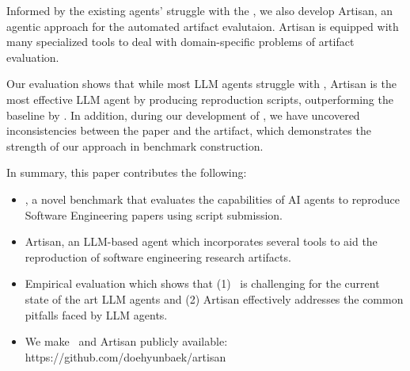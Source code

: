 Informed by the existing agents' struggle with the \benchmark, we also develop Artisan, an agentic approach for the automated artifact evalutaion.
Artisan is equipped with many specialized tools to deal with domain-specific problems of artifact evaluation.

Our evaluation shows that while most LLM agents struggle with \benchmark, Artisan is the most effective LLM agent by producing \artisanpartial{} reproduction scripts, outperforming the baseline by \artisanpartialoutperform{}.
In addition, during our development of \benchmark, we have uncovered \inconsistencies{} inconsistencies between the paper and the artifact, which demonstrates the strength of our approach in benchmark construction.

In summary, this paper contributes the following:
\begin{itemize}
    \item \benchmark, a novel benchmark that evaluates the capabilities of AI agents to reproduce Software Engineering papers using script submission.
    \item Artisan, an LLM-based agent which incorporates several tools to aid the reproduction of software engineering research artifacts.
    \item Empirical evaluation which shows that (1) \benchmark~is challenging for the current state of the art LLM agents and (2) Artisan effectively addresses the common pitfalls faced by LLM agents.
    \item We make \benchmark~and Artisan publicly available: https://github.com/doehyunbaek/artisan
\end{itemize}
